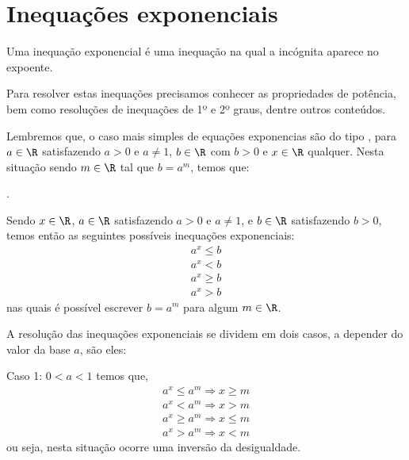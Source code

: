  \section{Inequações exponenciais}
 
 \vskip0.3cm
 \colorbox{azul}{
 \begin{minipage}{0.9\linewidth}
 \begin{center}
  Uma inequação exponencial é uma inequação na qual a incógnita aparece no expoente.
 \end{center}
 \end{minipage}}
 \vskip0.3cm 
 
 Para resolver estas inequações precisamos conhecer as propriedades de potência, bem como resoluções de inequações de 1º e 2º graus, dentre outros conteúdos. 
 
  Lembremos que, o caso mais simples de equações exponencias são do tipo
 ,
 para $a \in \R$ satisfazendo $a > 0$ e $a \neq 1$, $b \in \R$ com $b > 0$ e $x \in \R$ qualquer. Nesta situação sendo $m \in \R$ tal que $b= a^{m}$, temos que:

 .
 
 \vskip0.3cm
 \colorbox{azul}{
 \begin{minipage}{0.9\linewidth}
 \begin{center}
  Sendo $x \in \R$, $a \in \R$ satisfazendo $a > 0$ e $a \neq 1$, e $b \in \R$ satisfazendo $b > 0$, temos então as seguintes possíveis inequações exponenciais:
 \begin{eqnarray*}
 a^x \leq b \\
 a^x < b \\
 a^x \geq b \\
 a^x > b 
 \end{eqnarray*} 
 nas quais é possível escrever $b=a^m$ para algum $m \in \R$.
 \end{center}
 \end{minipage}}
 \vskip0.3cm 
 
 A resolução das inequações exponenciais se dividem em dois casos, a depender do valor da base $a$, são eles:
 
 Caso 1: $0 < a < 1$ temos que,
  \begin{eqnarray*}
 a^x \leq a^m \Rightarrow x \geq m\\
 a^x < a^m \Rightarrow x > m \\
 a^x \geq a^m \Rightarrow x \leq m\\
 a^x > a^m \Rightarrow x < m
 \end{eqnarray*}
 ou seja, nesta situação ocorre uma inversão da desigualdade.
 
